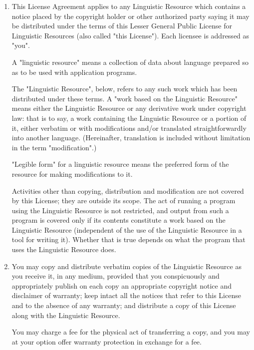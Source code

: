 \begin{enumerate}

\addtocounter{enumi}{-1}

\item 

This License Agreement applies to any Linguistic Resource which contains a notice placed
by the copyright holder or other authorized party saying it may be distributed under the terms
of this Lesser General Public License for Linguistic Resources (also called "this License"). Each
licensee is addressed as "you".

A "linguistic resource" means a collection of data about language prepared so as to be
used with application programs. 

The "Linguistic Resource", below, refers to any such work which has been distributed under
these terms. A "work based on the Linguistic Resource" means either the Linguistic Resource 
or any derivative work under copyright law: that is to say, a work containing the Linguistic
Resource or a portion of it, either verbatim or with modifications and/or translated 
straightforwardly into another language. (Hereinafter, translation is included without
limitation in the term "modification".)

"Legible form" for a linguistic resource means the preferred form of the resource for
making modifications to it.

Activities other than copying, distribution and modification are not covered by this
License; they are outside its scope. The act of running a program using the Linguistic 
Resource is not restricted, and output from such a program is covered only if its contents 
constitute a work based on the Linguistic Resource (independent of the use of the Linguistic 
Resource in a tool for writing it). Whether that is true depends on what the program that 
uses the Linguistic Resource does. 



\item 

You may copy and distribute verbatim copies of the Linguistic Resource as you receive it, 
in any medium, provided that you conspicuously and appropriately publish on each copy an 
appropriate copyright notice and disclaimer of warranty; keep intact all the notices that 
refer to this License and to the absence of any warranty; and distribute a copy of this 
License along with the Linguistic Resource.

You may charge a fee for the physical act of transferring a copy, and you may at your 
option offer warranty protection in exchange for a fee. 




\end{enumerate}
